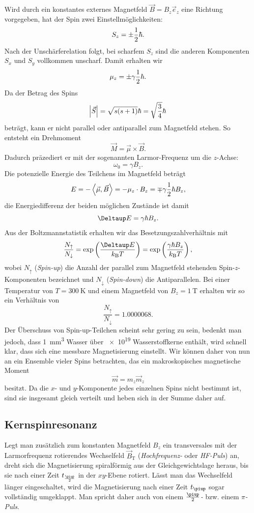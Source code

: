\documentclass[
    11pt,
    ngerman
]{scrbook}
\begin{document}
Wird durch ein konstantes externes Magnetfeld $\vec B = B_z \vec e_z$ eine
Richtung vorgegeben, hat der Spin zwei Einstellmöglichkeiten:
\[
    S_z = \pm\frac 12\hbar.
\]
Nach der Unschärferelation folgt, bei scharfem $S_z$ sind die anderen
Komponenten $S_x$ und $S_y$ vollkommen unscharf. Damit erhalten wir
\[
    \mu_z = \pm\gamma\frac 12\hbar.
\]
Da der Betrag des Spins 
\[
    \abs{\vec S} = \sqrt{s(s+1)}\hbar = \sqrt{\frac34}\hbar
\]
beträgt, kann er nicht parallel oder antiparallel zum Magnetfeld stehen. So
entsteht ein Drehmoment
\[
    \vec M = \vec \mu \times \vec B.
\]
Dadurch präzediert er mit der sogenannten Larmor-Frequenz um die $z$-Achse:
\[
    \omega_0 = \gamma B_z.
\]
Die potenzielle Energie des Teilchens im Magnetfeld beträgt
\[
    E = -\left\langle\vec\mu,\vec B\right\rangle = -\mu_z \cdot B_z = \mp\gamma\frac 12\hbar B_z,
\]
die Energiedifferenz der beiden möglichen Zustände ist damit
\[
    \Deltaup E = \gamma\hbar B_z.
\]
Aus der Boltzmannstatistik erhalten wir das Besetzungszahlverhältnis mit
\[
    \frac{N_\uparrow}{N_\downarrow} = \dexp{\frac{\Deltaup E}{k_\text{B}T}} =
    \dexp{\frac{\gamma\hbar B_z}{k_\text{B}T}},
\]
wobei $N_\uparrow$ (\emph{Spin-up}) die Anzahl der parallel zum Magnetfeld
stehenden Spin-$z$-Komponenten bezeichnet und $N_\downarrow$ (\emph{Spin-down})
die Antiparallelen. Bei einer Temperatur von $T = \SI{300}{\kelvin}$ und einem
Magnetfeld von $B_z = \SI{1}{\tesla}$ erhalten wir so ein Verhältnis von
\[
    \frac{N_\uparrow}{N_\downarrow} = \num{1.0000068}.
\]
Der Überschuss von Spin-up-Teilchen scheint sehr gering zu sein, bedenkt man
jedoch, dass \SI{1}{\milli\meter\cubed} Wasser über \num{e19} Wasserstoffkerne
enthält, wird schnell klar, dass sich eine messbare Magnetisierung einstellt.
Wir können daher von nun an ein Ensemble vieler Spins betrachten, das ein
makroskopisches magnetische Moment
\[
    \vec m = m_z\vec m_z
\]
besitzt. Da die $x$- und $y$-Komponente jedes einzelnen Spins nicht bestimmt
ist, sind sie insgesamt gleich verteilt und heben sich in der Summe daher auf.

\subsection{Kernspinresonanz}

Legt man zusätzlich zum konstanten Magnetfeld $B_z$ ein transversales mit der
Larmorfrequenz rotierendes Wechselfeld $\vec B_\text{T}$ (\emph{Hochfrequenz-}
oder \emph{HF-Puls}) an, dreht sich die Magnetisierung spiralförmig aus der
Gleichgewichtslage heraus, bis sie nach einer Zeit $t_{\frac\piup2}$ in der
$xy$-Ebene rotiert. Lässt man das Wechselfeld länger eingeschaltet, wird die
Magnetisierung nach einer Zeit $t_{\piup}$ sogar vollständig umgeklappt. Man
spricht daher auch von einem \emph{$\frac\piup2$-} bzw. einem
\emph{$\pi$-Puls}.
\end{document}
